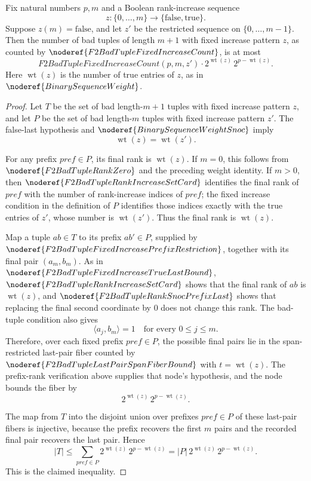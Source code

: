 \begin{helper}
Fix natural numbers \(p,m\) and a Boolean rank-increase sequence
\[
  z:\{0,\ldots,m\}\to\{\mathrm{false},\mathrm{true}\}.
\]
Suppose \(z(m)=\mathrm{false}\), and let \(z'\) be the restricted sequence on
\(\{0,\ldots,m-1\}\). Then the number of bad tuples of length \(m+1\) with
fixed increase pattern \(z\), as counted by
\(\noderef{F2BadTupleFixedIncreaseCount}\), is at most
\[
  F2BadTupleFixedIncreaseCount(p,m,z')\cdot
  2^{\operatorname{wt}(z)}\,2^{p-\operatorname{wt}(z)}.
\]
Here \(\operatorname{wt}(z)\) is the number of true entries of \(z\), as in
\(\noderef{BinarySequenceWeight}\).
\end{helper}
\begin{proof}
Let \(T\) be the set of bad length-\(m+1\) tuples with fixed increase pattern
\(z\), and let \(P\) be the set of bad length-\(m\) tuples with fixed increase
pattern \(z'\). The false-last hypothesis and
\(\noderef{BinarySequenceWeightSnoc}\) imply
\[
  \operatorname{wt}(z)=\operatorname{wt}(z').
\]

For any prefix \(pref\in P\), its final rank is \(\operatorname{wt}(z)\). If
\(m=0\), this follows from \(\noderef{F2BadTupleRankZero}\) and the preceding
weight identity. If \(m>0\), then
\(\noderef{F2BadTupleRankIncreaseSetCard}\) identifies the final rank of
\(pref\) with the number of rank-increase indices of \(pref\); the fixed
increase condition in the definition of \(P\) identifies those indices exactly
with the true entries of \(z'\), whose number is \(\operatorname{wt}(z')\).
Thus the final rank is \(\operatorname{wt}(z)\).

Map a tuple \(ab\in T\) to its prefix \(ab'\in P\), supplied by
\(\noderef{F2BadTupleFixedIncreasePrefixRestriction}\), together with its final
pair \((a_m,b_m)\). As in \(\noderef{F2BadTupleFixedIncreaseTrueLastBound}\),
\(\noderef{F2BadTupleRankIncreaseSetCard}\) shows that the final rank of
\(ab\) is \(\operatorname{wt}(z)\), and
\(\noderef{F2BadTupleRankSnocPrefixLast}\) shows that replacing the final
second coordinate by \(0\) does not change this rank. The bad-tuple condition
also gives
\[
  \langle a_j,b_m\rangle=1
  \quad\text{for every }0\le j\le m.
\]
Therefore, over each fixed prefix \(pref\in P\), the possible final pairs lie
in the span-restricted last-pair fiber counted by
\(\noderef{F2BadTupleLastPairSpanFiberBound}\) with
\(t=\operatorname{wt}(z)\). The prefix-rank verification above supplies that
node's hypothesis, and the node bounds the fiber by
\[
  2^{\operatorname{wt}(z)}\,2^{p-\operatorname{wt}(z)}.
\]

The map from \(T\) into the disjoint union over prefixes \(pref\in P\) of these
last-pair fibers is injective, because the prefix recovers the first \(m\)
pairs and the recorded final pair recovers the last pair. Hence
\[
  |T|
  \le \sum_{pref\in P}
      2^{\operatorname{wt}(z)}\,2^{p-\operatorname{wt}(z)}
  = |P|\,2^{\operatorname{wt}(z)}\,2^{p-\operatorname{wt}(z)}.
\]
This is the claimed inequality.
\end{proof}
